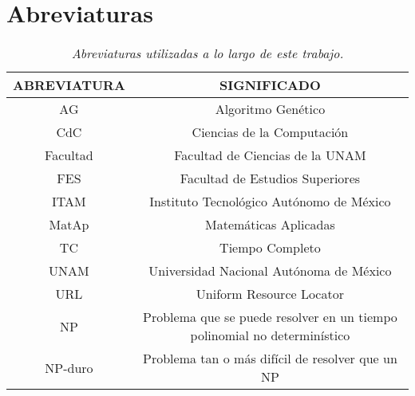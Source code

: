 \section{Abreviaturas}


\begin{table}[H]
\centering
\begin{tabular}{|c|c|}
\hline 
 \textbf{ABREVIATURA} & \textbf{SIGNIFICADO} \\ 
\hline 
 AG & Algoritmo Genético \\ 
\hline 
 CdC & Ciencias de la Computación \\ 
\hline 
 Facultad & Facultad de Ciencias de la UNAM \\ 
\hline 
 FES & Facultad de Estudios Superiores \\
\hline 
 ITAM & Instituto Tecnológico Autónomo de México \\ 
\hline 
 MatAp & Matemáticas Aplicadas \\ 
\hline 
 TC & Tiempo Completo \\ 
\hline 
 UNAM & Universidad Nacional Autónoma de México \\ 
\hline 
 URL & Uniform Resource Locator \\ 
\hline 
 NP & Problema que se puede resolver en un tiempo polinomial no determinístico \\ %
\hline 
 NP-duro & Problema tan o más difícil de resolver que un NP \\ %
\hline 
\end{tabular} 
\caption[\textit{Abreviaturas}]{\textit{Abreviaturas utilizadas a lo largo de este trabajo.}}
\end{table}
